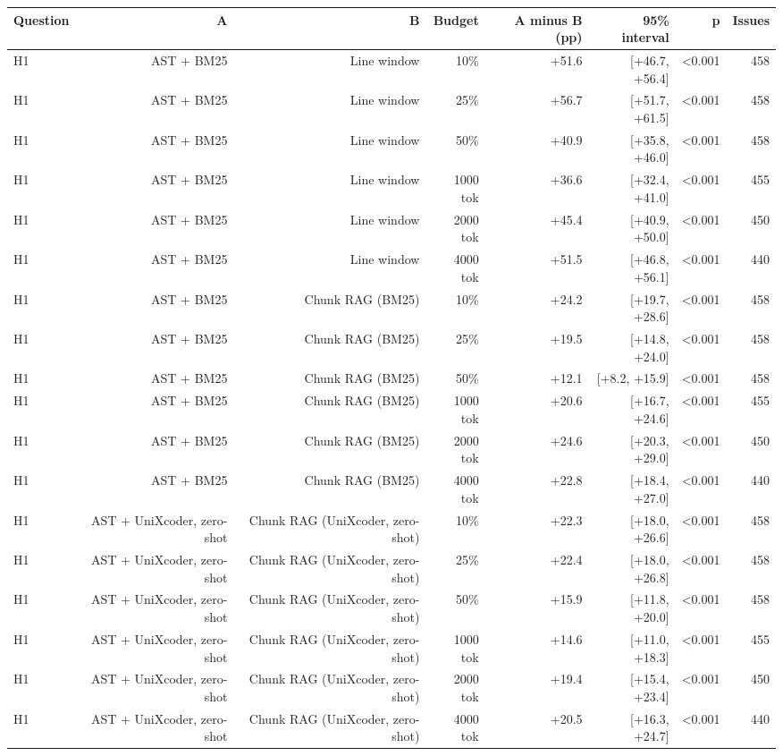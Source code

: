 \begin{tabular}{lrrrrrrr}
\toprule
Question & A & B & Budget & A minus B (pp) & 95\% interval & p & Issues \\
\midrule
H1 & AST + BM25 & Line window & 10\% & +51.6 & [+46.7, +56.4] & <0.001 & 458 \\
H1 & AST + BM25 & Line window & 25\% & +56.7 & [+51.7, +61.5] & <0.001 & 458 \\
H1 & AST + BM25 & Line window & 50\% & +40.9 & [+35.8, +46.0] & <0.001 & 458 \\
H1 & AST + BM25 & Line window & 1000 tok & +36.6 & [+32.4, +41.0] & <0.001 & 455 \\
H1 & AST + BM25 & Line window & 2000 tok & +45.4 & [+40.9, +50.0] & <0.001 & 450 \\
H1 & AST + BM25 & Line window & 4000 tok & +51.5 & [+46.8, +56.1] & <0.001 & 440 \\
H1 & AST + BM25 & Chunk RAG (BM25) & 10\% & +24.2 & [+19.7, +28.6] & <0.001 & 458 \\
H1 & AST + BM25 & Chunk RAG (BM25) & 25\% & +19.5 & [+14.8, +24.0] & <0.001 & 458 \\
H1 & AST + BM25 & Chunk RAG (BM25) & 50\% & +12.1 & [+8.2, +15.9] & <0.001 & 458 \\
H1 & AST + BM25 & Chunk RAG (BM25) & 1000 tok & +20.6 & [+16.7, +24.6] & <0.001 & 455 \\
H1 & AST + BM25 & Chunk RAG (BM25) & 2000 tok & +24.6 & [+20.3, +29.0] & <0.001 & 450 \\
H1 & AST + BM25 & Chunk RAG (BM25) & 4000 tok & +22.8 & [+18.4, +27.0] & <0.001 & 440 \\
H1 & AST + UniXcoder, zero-shot & Chunk RAG (UniXcoder, zero-shot) & 10\% & +22.3 & [+18.0, +26.6] & <0.001 & 458 \\
H1 & AST + UniXcoder, zero-shot & Chunk RAG (UniXcoder, zero-shot) & 25\% & +22.4 & [+18.0, +26.8] & <0.001 & 458 \\
H1 & AST + UniXcoder, zero-shot & Chunk RAG (UniXcoder, zero-shot) & 50\% & +15.9 & [+11.8, +20.0] & <0.001 & 458 \\
H1 & AST + UniXcoder, zero-shot & Chunk RAG (UniXcoder, zero-shot) & 1000 tok & +14.6 & [+11.0, +18.3] & <0.001 & 455 \\
H1 & AST + UniXcoder, zero-shot & Chunk RAG (UniXcoder, zero-shot) & 2000 tok & +19.4 & [+15.4, +23.4] & <0.001 & 450 \\
H1 & AST + UniXcoder, zero-shot & Chunk RAG (UniXcoder, zero-shot) & 4000 tok & +20.5 & [+16.3, +24.7] & <0.001 & 440 \\

\end{tabular}
